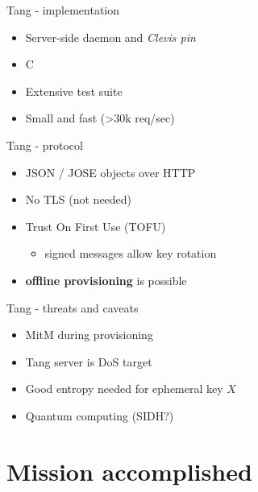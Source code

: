 \documentclass[ignorenonframetext,aspectratio=169]{beamer}
\begin{document}
\begin{frame}{Tang - implementation}
\protect\hypertarget{tang---implementation}{}

\begin{itemize}
\item
  Server-side daemon and \emph{Clevis pin}
\item
  C
\item
  Extensive test suite
\item
  Small and fast (\textgreater{}30k req/sec)
\end{itemize}

\end{frame}

\begin{frame}{Tang - protocol}
\protect\hypertarget{tang---protocol}{}

\begin{itemize}
\item JSON / JOSE objects over HTTP
\item No TLS (not needed)
\item Trust On First Use (TOFU)

  \begin{itemize}
  \item signed messages allow key rotation
  \end{itemize}

\item {\bf offline provisioning} is possible
\end{itemize}

\end{frame}

\begin{frame}{Tang - threats and caveats}
\protect\hypertarget{tang---threats-and-caveats}{}

\begin{itemize}
\item
  MitM during provisioning
\item
  Tang server is DoS target
\item
  Good entropy needed for ephemeral key \(X\)
\item
  Quantum computing (SIDH?)
\end{itemize}

\end{frame}

\hypertarget{mission-accomplished}{%
\section{Mission accomplished}\label{mission-accomplished}}
\end{document}
